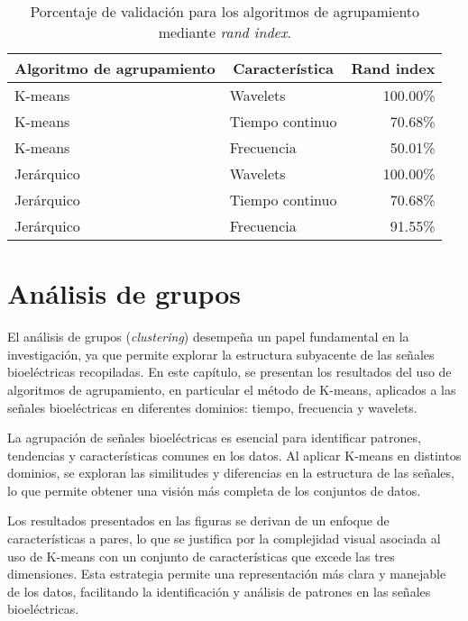 \begin{table}[H]
\begin{center}
    \begin{tabular}{|l|l|r|}
    \hline
        \multicolumn{1}{|c|}{\textbf{Algoritmo de agrupamiento}} & \multicolumn{1}{c|}{\textbf{Característica}} & \multicolumn{1}{c|}{\textbf{Rand index}}\\ \hline
        K-means  & Wavelets &  100.00\% \\ \hline
        K-means  & Tiempo continuo & 70.68\% \\ \hline
        K-means  & Frecuencia & 50.01\% \\ \hline
        Jerárquico & Wavelets &  100.00\% \\ \hline
        Jerárquico & Tiempo continuo & 70.68\% \\ \hline
        Jerárquico & Frecuencia & 91.55\% \\ \hline
    \end{tabular}
    \caption[Resultado rand index para algoritmos de agrupamiento]{Porcentaje de validación para los algoritmos de agrupamiento mediante \textit{rand index}.} 
    \label{cuadro:resultado rand index}
\end{center}
\end{table}

\chapter{Análisis de grupos}
El análisis de grupos (\textit{clustering}) desempeña un papel fundamental en la investigación, ya que permite explorar la estructura subyacente de las señales bioeléctricas recopiladas. En este capítulo, se presentan los resultados del uso de algoritmos de agrupamiento, en particular el método de K-means, aplicados a las señales bioeléctricas en diferentes dominios: tiempo, frecuencia y wavelets.

La agrupación de señales bioeléctricas es esencial para identificar patrones, tendencias y características comunes en los datos. Al aplicar K-means en distintos dominios, se exploran las similitudes y diferencias en la estructura de las señales, lo que permite obtener una visión más completa de los conjuntos de datos.

Los resultados presentados en las figuras se derivan de un enfoque de características a pares, lo que se justifica por la complejidad visual asociada al uso de K-means con un conjunto de características que excede las tres dimensiones. Esta estrategia permite una representación más clara y manejable de los datos, facilitando la identificación y análisis de patrones en las señales bioeléctricas.

